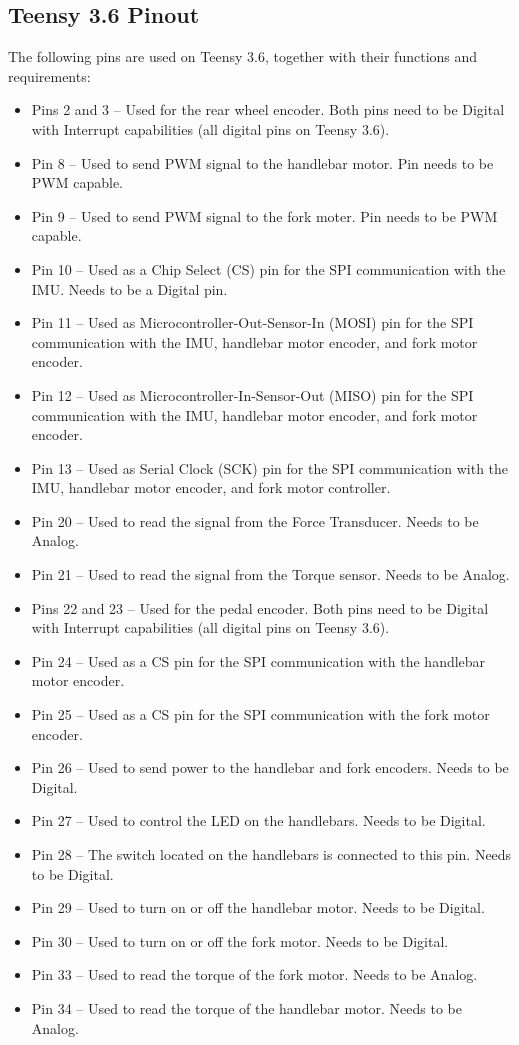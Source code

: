 \subsection{Teensy 3.6 Pinout}
The following pins are used on Teensy 3.6, together with their functions and requirements:
\begin{itemize}[noitemsep]
  \item Pins 2 and 3 -- Used for the rear wheel encoder. Both pins need to be Digital with Interrupt capabilities (all digital pins on Teensy 3.6).
  \item Pin 8 -- Used to send PWM signal to the handlebar motor. Pin needs to be PWM capable.
  \item Pin 9 -- Used to send PWM signal to the fork moter. Pin needs to be PWM capable.
  \item Pin 10 -- Used as a Chip Select (CS) pin for the SPI communication with the IMU. Needs to be a Digital pin.
  \item Pin 11 -- Used as Microcontroller-Out-Sensor-In (MOSI) pin for the SPI communication with the IMU, handlebar motor encoder, and fork motor encoder.
  \item Pin 12 -- Used as Microcontroller-In-Sensor-Out (MISO) pin for the SPI communication with the IMU, handlebar motor encoder, and fork motor encoder.
  \item Pin 13 -- Used as Serial Clock (SCK) pin for the SPI communication with the IMU, handlebar motor encoder, and fork motor controller.
  \item Pin 20 -- Used to read the signal from the Force Transducer. Needs to be Analog.
  \item Pin 21 -- Used to read the signal from the Torque sensor. Needs to be Analog.
  \item Pins 22 and 23 -- Used for the pedal encoder. Both pins need to be Digital with Interrupt capabilities (all digital pins on Teensy 3.6).
  \item Pin 24 -- Used as a CS pin for the SPI communication with the handlebar motor encoder.
  \item Pin 25 -- Used as a CS pin for the SPI communication with the fork motor encoder.
  \item Pin 26 -- Used to send power to the handlebar and fork encoders. Needs to be Digital.
  \item Pin 27 -- Used to control the LED on the handlebars. Needs to be Digital.
  \item Pin 28 -- The switch located on the handlebars is connected to this pin. Needs to be Digital.
  \item Pin 29 -- Used to turn on or off the handlebar motor. Needs to be Digital.
  \item Pin 30 -- Used to turn on or off the fork motor. Needs to be Digital.
  \item Pin 33 -- Used to read the torque of the fork motor. Needs to be Analog.
  \item Pin 34 -- Used to read the torque of the handlebar motor. Needs to be Analog.
\end{itemize}

